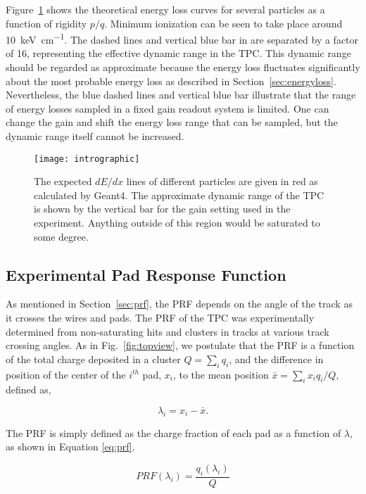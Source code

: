 Figure~\ref{fig:intro} shows the theoretical energy loss curves for several particles as a function of rigidity $p/q$. Minimum ionization can be seen to take place around \SI{10}{\kilo\electronvolt\per\centi\metre}. The dashed lines and vertical blue bar in are separated by a factor of 16, representing the effective dynamic range in the \spirit TPC. This dynamic range should be regarded as approximate because the energy loss fluctuates significantly about the most probable energy loss as described in Section~\ref{sec:energyloss}. Nevertheless, the blue dashed lines and vertical blue bar illustrate that the range of energy losses sampled in a fixed gain readout system is limited. One can change the gain and shift the energy loss range that can be sampled, but the dynamic range itself cannot be increased.

  
\begin{figure}[ht!]
\texttt{[image: intrographic]}
\caption{The expected $dE/dx$ lines of different particles are given in red as calculated by Geant4. The approximate dynamic range of the TPC is shown by the vertical bar for the gain setting used in the experiment. Anything outside of this region would be saturated to some degree.}
\label{fig:intro}
\end{figure}


\subsection{Experimental Pad Response Function}
\label{sec:expPRF}
As mentioned in Section~\ref{sec:prf}, the PRF depends on the angle of the track as it crosses the wires and pads. The PRF of the TPC was experimentally determined from non-saturating hits and clusters in tracks at various track crossing angles. As in Fig.~\ref{fig:topview}, we postulate that the PRF is a function of the total charge deposited in a cluster $Q = \sum_i q_i$, and the difference in position of the center of the $i^{th}$ pad, $x_i$, to the mean position $\bar{x} = \sum_i x_i q_i/Q$, defined as,

\begin{equation}
\lambda_i = x_i-\bar{x}. 
\label{eq:lambda}
\end{equation}

The PRF is simply defined as the charge fraction of each pad as a function of $\lambda$, as shown in Equation \ref{eq:prf}. 

\begin{equation}\label{eq:prf}
PRF(\lambda_i) = \frac{q_i(\lambda_i)}{Q}
\end{equation}

